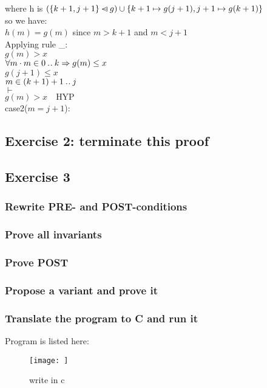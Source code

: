 \documentclass[11pt,a4paper,fleqn]{article}
\begin{document}
\noindent
where h is $ (\{k+1, j+1\} \mathbin{\lhd\mkern-14mu-} g) \cup\{k+1 \mapsto g(j+1), j+1 \mapsto g(k+1)\}$\\
\noindent so we have:\\
$h(m) = g(m)$ since $m>k+1 $ and $m<j+1$\\ 
\noindent Applying rule \_:\\
$g(m)>x $\\
$ \forall m \cdot m \in 0 \mathbin{.\mkern1mu.} k \Rightarrow g(m) \leq x $\\
$g(j+1) \leq x $\\
$m \in (k + 1)+1 \mathbin{.\mkern1mu.} j$\\
$\vdash$\\
$g(m)>x \quad \text{HYP}$\\

\noindent
case2($m = j+1 $):\\



\subsection{Exercise 2: terminate this proof}
\noindent




\subsection{Exercise 3}

\subsubsection{Rewrite PRE- and POST-conditions}


\subsubsection{Prove all invariants}

\subsubsection{Prove POST}

\subsubsection{Propose a variant and prove it}

\subsubsection{Translate the program to C and run it}
Program is listed here:\\

\begin{figure}[h!]
\centering
\texttt{[image: ]}
\caption{ write in c}
\label{fig}
\end{figure}



%
%
\end{document}
